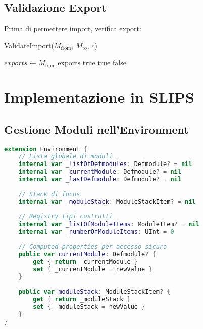 \subsection{Validazione Export}

Prima di permettere import, verifica export:

\begin{algorithm}[H]
\caption{ValidateImport($M_{\text{from}}$, $M_{\text{to}}$, $c$)}
\begin{algorithmic}[1]
\State $exports \gets M_{\text{from}}.\text{exports}$
    \State \Return $\text{true}$ 
\EndIf
{}
        \State \Return $\text{true}$ 
    \EndIf
\EndFor
\State \Return $\text{false}$ 
\end{algorithmic}
\end{algorithm}

\section{Implementazione in SLIPS}

\subsection{Gestione Moduli nell'Environment}

\begin{lstlisting}[language=Swift]
extension Environment {
    // Lista globale di moduli
    internal var _listOfDefmodules: Defmodule? = nil
    internal var _currentModule: Defmodule? = nil
    internal var _lastDefmodule: Defmodule? = nil
    
    // Stack di focus
    internal var _moduleStack: ModuleStackItem? = nil
    
    // Registry tipi costrutti
    internal var _listOfModuleItems: ModuleItem? = nil
    internal var _numberOfModuleItems: UInt = 0
    
    // Computed properties per accesso sicuro
    public var currentModule: Defmodule? {
        get { return _currentModule }
        set { _currentModule = newValue }
    }
    
    public var moduleStack: ModuleStackItem? {
        get { return _moduleStack }
        set { _moduleStack = newValue }
    }
}
\end{lstlisting}

